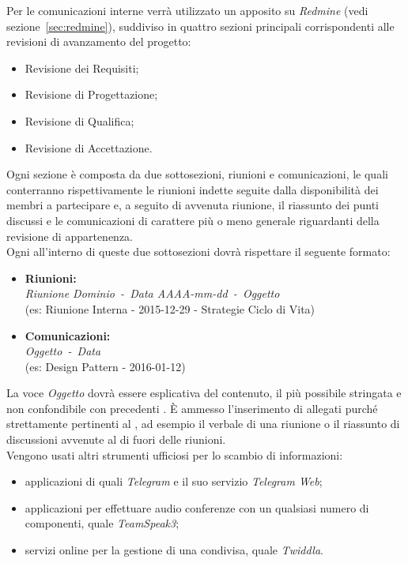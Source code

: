\documentclass{scalatekids-article}
\begin{document}
\label{sec:ComunicazioniInterne}
Per le comunicazioni interne verrà utilizzato un  apposito su
\textit{Redmine} (vedi sezione~\ref{sec:redmine}), suddiviso in quattro sezioni
principali corrispondenti alle revisioni di avanzamento del progetto:
\begin{itemize}
    \item Revisione dei Requisiti;
    \item Revisione di Progettazione;
    \item Revisione di Qualifica;
    \item Revisione di Accettazione.
\end{itemize}
Ogni sezione è composta da due sottosezioni, riunioni e comunicazioni, le quali
conterranno rispettivamente le riunioni indette seguite dalla disponibilità dei
membri a partecipare e, a seguito di avvenuta riunione, il riassunto dei punti
discussi e le comunicazioni di carattere più o meno generale riguardanti
 della revisione di appartenenza.\\ Ogni  all'interno di
queste due sottosezioni dovrà rispettare il seguente formato:
\begin{itemize}
    \item\textbf{Riunioni:}\\
        \textit{Riunione Dominio\ -\ Data AAAA-mm-dd\ -\ Oggetto}\\
        (es: Riunione Interna - 2015-12-29 - Strategie Ciclo di Vita)
    \item\textbf{Comunicazioni:}\\
        \textit{Oggetto\ -\ Data}\\
        (es: Design Pattern - 2016-01-12)
\end{itemize}
La voce \textit{Oggetto} dovrà essere esplicativa del contenuto, il più
possibile stringata e non confondibile con precedenti . È ammesso
l'inserimento di allegati purché strettamente pertinenti al , ad
esempio il verbale di una riunione o il riassunto di discussioni avvenute al di
fuori delle riunioni.\\ Vengono usati altri strumenti ufficiosi per lo scambio
di informazioni:
\begin{itemize}
    \item applicazioni di  quali \textit{Telegram} e il suo servizio \textit{Telegram Web};
    \item applicazioni  per effettuare audio conferenze con un qualsiasi numero di componenti, quale \textit{TeamSpeak3};
    \item servizi online per la gestione di una  condivisa, quale \textit{Twiddla}.
\end{itemize}
\end{document}
